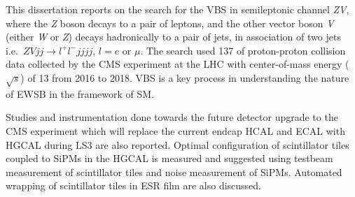 This dissertation reports on the search for
the \gls{VBS} in semileptonic channel \textit{ZV},
where the \textit{Z} boson decays to a pair of leptons,
and the other vector boson \textit{V} (either \textit{W} or \textit{Z})
decays hadronically to a pair of jets, in association of two jets
i.e.~\( \textit{ZV}jj \rightarrow l^{+}l^-jjjj \), \( l=e \) or \( \mu \).
The search used 137 \fbinv{} of proton-proton collision data collected by
the \gls{CMS} experiment at the \gls{LHC} with
center-of-mass energy (\( \sqrt{s} \)) of 13 \TeV{} from 2016 to 2018.
\gls{VBS} is a key process in understanding the nature of \gls{EWSB} in
the framework of \gls{SM}.

Studies and instrumentation done towards the future detector
upgrade to the \gls{CMS} experiment which will replace
the current endcap \gls{HCAL} and \gls{ECAL} with \gls{HGCAL}
during \gls{LS3} are also reported.
Optimal configuration
of scintillator tiles coupled to \glspl{SiPM}
in the \gls{HGCAL} is measured and suggested using testbeam measurement of
scintillator tiles and noise measurement of \glspl{SiPM}.
Automated wrapping of scintillator tiles in \gls{ESR} film
are also discussed.
